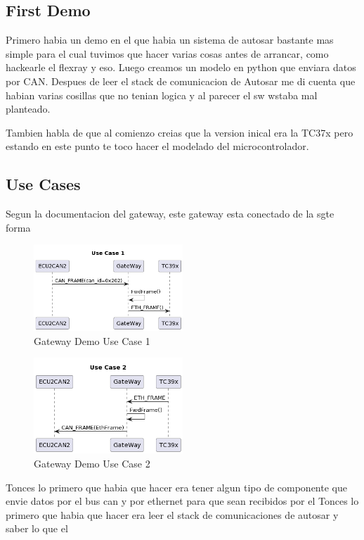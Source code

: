 \subsection{First Demo}
Primero habia un demo en el que habia un sistema de autosar bastante mas simple para el cual tuvimos que hacer varias cosas antes de arrancar, como hackearle el flexray y eso. Luego creamos un modelo en python que enviara datos por CAN. Despues de leer el stack de comunicacion de Autosar me di cuenta que habian varias cosillas que no tenian logica y al parecer el sw wstaba mal planteado. 

Tambien habla de que al comienzo creias que la version inical era la TC37x pero estando en este punto te toco hacer el modelado del microcontrolador.
\subsection{Use Cases}
Segun la documentacion del gateway, este gateway esta conectado de la sgte forma

\begin{figure}[!htb]
 \centering
 \includegraphics[width=0.5\textwidth]{img/GWUseCase1.png}
 \caption{Gateway Demo Use Case 1}
 \label{fig:gw-demo-uc1}
\end{figure}

\begin{figure}[!htb]
 \centering
 \includegraphics[width=0.5\textwidth]{img/GWUseCase2.png}
 \caption{Gateway Demo Use Case 2}
 \label{fig:gw-demo-uc2}
\end{figure}

Tonces lo primero que habia que hacer era tener algun tipo de componente que envie datos por el bus can y por ethernet para que sean recibidos por el 
Tonces lo primero que habia que hacer era leer el stack de comunicaciones de autosar y saber lo que el 
